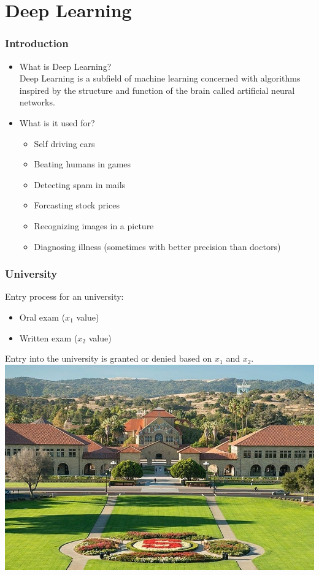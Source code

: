\section{Deep Learning}

\begin{frame}[fragile]
  \frametitle{Introduction}
  \begin{itemize}
  \item What is Deep Learning?\\
  Deep Learning is a subfield of machine learning concerned with algorithms inspired by the structure and function of the brain called artificial neural networks.
  \item What is it used for?
  \begin{itemize}
  \item Self driving cars
  \item Beating humans in games
  \item Detecting spam in mails
  \item Forcasting stock prices
  \item Recognizing images in a picture
  \item Diagnosing illness (sometimes with better precision than doctors)
  \end{itemize}
  \end{itemize}
\end{frame}

\begin{frame}[fragile]
  \frametitle{University}
  Entry process for an university:
  \begin{itemize}
  \item Oral exam ($x_1$ value)
  \item Written exam ($x_2$ value)
  \end{itemize}
  Entry into the university is granted or denied based on $x_1$ and $x_2$.\\
  \vspace{3mm}
  \includegraphics[scale=0.2]{img/stanford}
\end{frame}

